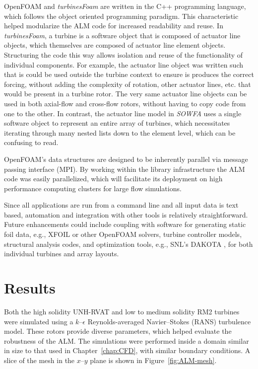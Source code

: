 OpenFOAM and \textit{turbinesFoam} are written in the C++ programming language,
which follows the object oriented programming paradigm. This characteristic
helped modularize the ALM code for increased readability and reuse. In
\textit{turbinesFoam}, a turbine is a software object that is composed of
actuator line objects, which themselves are composed of actuator line element
objects. Structuring the code this way allows isolation and reuse of the
functionality of individual components. For example, the actuator line object
was written such that is could be used outside the turbine context to ensure is
produces the correct forcing, without adding the complexity of rotation, other
actuator lines, etc. that would be present in a turbine rotor. The very same
actuator line objects can be used in both axial-flow and cross-flow rotors,
without having to copy code from one to the other. In contrast, the actuator
line model in \textit{SOWFA} uses a single software object to represent an
entire array of turbines, which necessitates iterating through many nested lists
down to the element level, which can be confusing to read.

OpenFOAM's data structures are designed to be inherently parallel via message
passing interface (MPI). By working within the library infrastructure the ALM
code was easily parallelized, which will facilitate its deployment on high
performance computing clusters for large flow simulations.

Since all applications are run from a command line and all input data is text
based, automation and integration with other tools is relatively
straightforward. Future enhancements could include coupling with software for
generating static foil data, e.g., XFOIL or other OpenFOAM solvers, turbine
controller models, structural analysis codes, and optimization tools, e.g.,
SNL's DAKOTA , for both individual
turbines and array layouts.


\section{Results}

Both the high solidity UNH-RVAT and low to medium solidity RM2 turbines were
simulated using a $k$--$\epsilon$ Reynolds-averaged Navier--Stokes (RANS)
turbulence model. These rotors provide diverse parameters, which helped evaluate
the robustness of the ALM. The simulations were performed inside a domain
similar in size to that used in Chapter~\ref{chap:CFD}, with similar boundary
conditions. A slice of the mesh in the $x$--$y$ plane is shown in
Figure~\ref{fig:ALM-mesh}.

